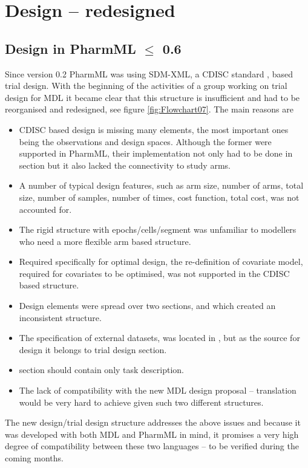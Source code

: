 \chapter{Design -- redesigned}
\label{ch:Design}

\section{Design in PharmML $\leq$ 0.6}
Since version 0.2 PharmML was using SDM-XML, a CDISC standard \cite{CDISC:2011a}, 
based trial design. With the beginning of the activities of a group working on trial design
for MDL it became clear that this structure is insufficient and had to be reorganised and 
redesigned, see figure \ref{fig:Flowchart07}. The main reasons are 
\begin{itemize}
\item
CDISC based design is missing many elements, the most important ones being 
the observations and design spaces. Although the former were supported in 
PharmML, their implementation not only had to be done in  
section but it also lacked the connectivity to study arms.
\item
A number of typical design features, such as arm size, number of arms, total size,
number of samples, number of times, cost function, total cost, was not accounted for.
\item
The rigid structure with epochs/cells/segment was unfamiliar to modellers 
who need a more flexible arm based structure.
\item
Required specifically for optimal design, the re-definition of covariate 
model, required for covariates to be optimised, was not supported in the CDISC 
based structure.
\item
Design elements were spread over two sections,  and 
which created an inconsistent structure.
\item
The specification of external datasets, was located in , but as 
the source for design it belongs to trial design section.
\item
{} section should contain only task description.
\item
The lack of compatibility with the new MDL design proposal -- translation would be 
very hard to achieve given such two different structures.
\end{itemize}
The new design/trial design structure addresses the above issues and 
because it was developed with both MDL and PharmML in mind, it promises 
a very high \marginpar{\HandCuffLeft} degree of compatibility between 
these two languages -- to be verified during the coming months. 


